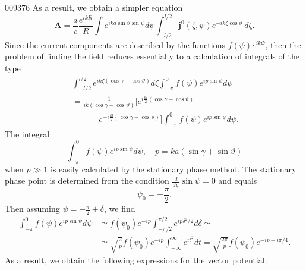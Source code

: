 \begin{scanpage}{0093}{76}
As a result, we obtain a simpler equation
\[\mathbf A=\frac ac\frac{e^{ikR}}R\int e^{ika\sin\vartheta\sin\psi}d\psi\int_{-l/2}^{l/2}\mathbf j^0(\zeta,\psi)e^{-ik\zeta\cos\vartheta}\,d\zeta.\tag{13.09}\]
Since the current components are described by the functions $f(\psi)e^{ik\Phi}$, then the problem of finding the field reduces essentially to a calculation of integrals of the type
\[
\begin{aligned}
&\int_{-l/2}^{l/2}e^{ik\zeta(\cos\gamma-\cos\vartheta)}d\zeta\int_{-\pi}^0f(\psi)e^{ip\sin\psi}d\psi=\\
&=\frac1{ik(\cos\gamma-\cos\vartheta)}[e^{i\frac{kl}2(\cos\gamma-\cos\vartheta)}\\
&\qquad-e^{-i\frac{kl}2(\cos\gamma-\cos\vartheta)}]\int_{-\pi}^0f(\psi)e^{ip\sin\psi}d\psi.
\end{aligned}\tag{13.10}
\]
The integral
\[\int_{-\pi}^0f(\psi)e^{ip\sin\psi}d\psi,\quad p=ka(\sin\gamma+\sin\vartheta)\tag{13.11}\]
when $p\gg1$ is easily calculated by the stationary phase method. The stationary phase point is determined from the condition $\frac d{d\psi}\sin\psi=0$ and equals
\[\psi_0=-\frac\pi2.\tag{13.12}\]
Then assuming $\psi=-\frac\pi2+\delta$, we find
\[
\begin{aligned}
\int_{-\pi}^0f(\psi)e^{ip\sin\psi}d\psi&\simeq f(\psi_0)e^{-ip}\int_{-\pi/2}^{\pi/2}e^{ip\delta^2/2}d\delta\simeq\\
&\simeq\sqrt{\frac2p}f(\psi_0)e^{-ip}\int_{-\infty}^{\infty}e^{it^2}dt=\sqrt{\frac{2\pi}p}f(\psi_0)e^{-ip+i\pi/4}.
\end{aligned}\tag{13.13}
\]
As a result, we obtain the following expressions for the vector potential:
\end{scanpage}
